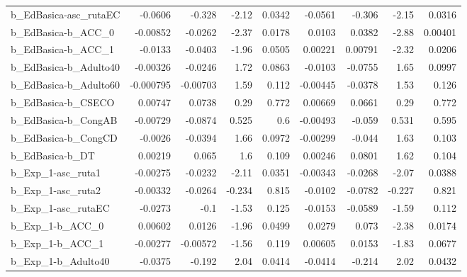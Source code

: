 \begin{tabular}{lrrrrrrrr}
b\_EdBasica-asc\_rutaEC      &     -0.0606 &       -0.328 &     -2.12 &   0.0342 &    -0.0561 &      -0.306 &        -2.15 &        0.0316 \\
b\_EdBasica-b\_ACC\_0         &    -0.00852 &      -0.0262 &     -2.37 &   0.0178 &     0.0103 &      0.0382 &        -2.88 &       0.00401 \\
b\_EdBasica-b\_ACC\_1         &     -0.0133 &      -0.0403 &     -1.96 &   0.0505 &    0.00221 &     0.00791 &        -2.32 &        0.0206 \\
b\_EdBasica-b\_Adulto40      &    -0.00326 &      -0.0246 &      1.72 &   0.0863 &    -0.0103 &     -0.0755 &         1.65 &        0.0997 \\
b\_EdBasica-b\_Adulto60      &   -0.000795 &     -0.00703 &      1.59 &    0.112 &   -0.00445 &     -0.0378 &         1.53 &         0.126 \\
b\_EdBasica-b\_CSECO         &     0.00747 &       0.0738 &      0.29 &    0.772 &    0.00669 &      0.0661 &         0.29 &         0.772 \\
b\_EdBasica-b\_CongAB        &    -0.00729 &      -0.0874 &     0.525 &      0.6 &   -0.00493 &      -0.059 &        0.531 &         0.595 \\
b\_EdBasica-b\_CongCD        &     -0.0026 &      -0.0394 &      1.66 &   0.0972 &   -0.00299 &      -0.044 &         1.63 &         0.103 \\
b\_EdBasica-b\_DT            &     0.00219 &        0.065 &       1.6 &    0.109 &    0.00246 &      0.0801 &         1.62 &         0.104 \\
b\_Exp\_1-asc\_ruta1          &    -0.00275 &      -0.0232 &     -2.11 &   0.0351 &   -0.00343 &     -0.0268 &        -2.07 &        0.0388 \\
b\_Exp\_1-asc\_ruta2          &    -0.00332 &      -0.0264 &    -0.234 &    0.815 &    -0.0102 &     -0.0782 &       -0.227 &         0.821 \\
b\_Exp\_1-asc\_rutaEC         &     -0.0273 &         -0.1 &     -1.53 &    0.125 &    -0.0153 &     -0.0589 &        -1.59 &         0.112 \\
b\_Exp\_1-b\_ACC\_0            &     0.00602 &       0.0126 &     -1.96 &   0.0499 &     0.0279 &       0.073 &        -2.38 &        0.0174 \\
b\_Exp\_1-b\_ACC\_1            &    -0.00277 &     -0.00572 &     -1.56 &    0.119 &    0.00605 &      0.0153 &        -1.83 &        0.0677 \\
b\_Exp\_1-b\_Adulto40         &     -0.0375 &       -0.192 &      2.04 &   0.0414 &    -0.0414 &      -0.214 &         2.02 &        0.0432 \\

\end{tabular}
